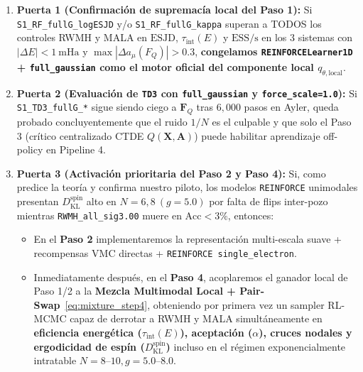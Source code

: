 \documentclass[10pt,a4paper]{article}
\begin{document}
\begin{enumerate}
\item \textbf{Puerta 1 (Confirmación de supremacía local del Paso 1):} Si \texttt{S1\_RF\_fullG\_logESJD} y/o \texttt{S1\_RF\_fullG\_kappa} superan a TODOS los controles RWMH y MALA en $\mathrm{ESJD}$, $\tau_{\mathrm{int}}(E)$ y $\mathrm{ESS/s}$ en los 3 sistemas con $|\Delta E| < 1\ \mathrm{mHa}$ y $\max|\Delta a_\mu(F_Q)| > 0.3$, \textbf{congelamos \texttt{REINFORCELearner1D} + \texttt{full\_gaussian} como el motor oficial del componente local $q_{\theta,\mathrm{local}}$}.
\item \textbf{Puerta 2 (Evaluación de \texttt{TD3} con \texttt{full\_gaussian} y \texttt{force\_scale=1.0}):} Si \texttt{S1\_TD3\_fullG\_*} sigue siendo ciego a $\bm{F}_Q$ tras $6{,}000$ pasos en Ayler, queda probado concluyentemente que el ruido $1/N$ es el culpable y que solo el Paso 3 (crítico centralizado CTDE $Q(\bm{X},\bm{A})$) puede habilitar aprendizaje off-policy en Pipeline 4.
\item \textbf{Puerta 3 (Activación prioritaria del Paso 2 y Paso 4):} Si, como predice la teoría y confirma nuestro piloto, los modelos \texttt{REINFORCE} unimodales presentan $D_{\mathrm{KL}}^{\mathrm{spin}}$ alto en $N=6, 8\ (g=5.0)$ por falta de flips inter-pozo mientras \texttt{RWMH\_all\_sig3.00} muere en $\mathrm{Acc} < 3\%$, entonces:
\begin{itemize}
\item En el \textbf{Paso 2} implementaremos la representación multi-escala suave + recompensas VMC directas + \texttt{REINFORCE single\_electron}.
\item Inmediatamente después, en el \textbf{Paso 4}, acoplaremos el ganador local de Paso 1/2 a la \textbf{Mezcla Multimodal Local + Pair-Swap}~\eqref{eq:mixture_step4}, obteniendo por primera vez un sampler RL-MCMC capaz de derrotar a RWMH y MALA simultáneamente en \textbf{eficiencia energética ($\tau_{\mathrm{int}}(E)$), aceptación ($\alpha$), cruces nodales y ergodicidad de espín ($D_{\mathrm{KL}}^{\mathrm{spin}}$)} incluso en el régimen exponencialmente intratable $N=8\text{--}10, g=5.0\text{--}8.0$.
\end{itemize}
\end{enumerate}
\end{document}
